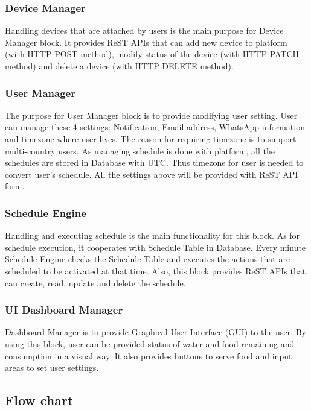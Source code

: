 \documentclass[conference]{IEEEtran}
\begin{document}
\subsubsection{Device Manager}
\hfill \break Handling devices that are attached by users is the main purpose for Device Manager block. It provides ReST APIs that can add new device to platform (with HTTP POST method), modify status of the device (with HTTP PATCH method) and delete a device (with HTTP DELETE method).

\subsubsection{User Manager}
\hfill \break The purpose for User Manager block is to provide modifying user setting. User can manage these 4 settings: Notification, Email address, WhatsApp information and timezone where user lives. The reason for requiring timezone is to support multi-country users. As managing schedule is done with platform, all the schedules are stored in Database with UTC. Thus timezone for user is needed to convert user’s schedule. All the settings above will be provided with ReST API form.

\subsubsection{Schedule Engine}
\hfill \break Handling and executing schedule is the main functionality for this block. As for schedule execution, it cooperates with Schedule Table in Database. Every minute Schedule Engine checks the Schedule Table and executes the actions that are scheduled to be activated at that time. Also, this block provides ReST APIs that can create, read, update and delete the schedule.

\subsubsection{UI Dashboard Manager}
\hfill \break Dashboard Manager is to provide Graphical User Interface (GUI) to the user. By using this block, user can be provided status of water and food remaining and consumption in a visual way. It also provides buttons to serve food and input areas to set user settings.


\subsection{Flow chart}
\end{document}
